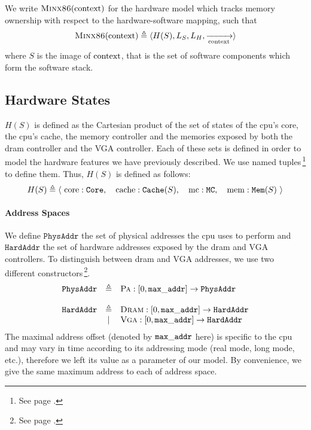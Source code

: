 \begin{definition}
  \label{def:speccert2:minx86}
  We write $\textsc{Minx86}(\mathrm{context})$ for the hardware model which
  tracks memory ownership with respect to the  hardware-software
  mapping, such that
%
  \[
    \textsc{Minx86}(\mathrm{context}) \triangleq \langle H(S), L_S, L_H,
    \xrightarrow[\mathrm{context}]{} \rangle
  \]
  where $S$ is the image of $\mathrm{context}$, that is the set of software
  components which form the software stack.
\end{definition}

\subsection{Hardware States}

$H(S)$ is defined as the Cartesian product of the set of states of the
\ac{cpu}'s core, the \ac{cpu}'s cache, the memory controller and the memories
exposed by both the \ac{dram} controller and the VGA controller.
%
Each of these sets is defined in order to model the hardware features we have
previously described.
%
We use named tuples\,\footnote{See page \pageref{frontmatter:notations}.} to
define them.
%
Thus, $H(S)$ is defined as follows:
%
\[
  H(S) \triangleq \left<\ \mathrm{core}: \texttt{Core},\quad\mathrm{cache}:
  \texttt{Cache}(S),\quad\mathrm{mc}: \texttt{MC},\quad\mathrm{mem}: \texttt{Mem}(S)
  \ \right>
\]

\paragraph{Address Spaces}
%
We define $\texttt{PhysAddr}$ the set of physical addresses the \ac{cpu} uses to
perform \IO and $\texttt{HardAddr}$ the set of hardware addresses exposed by the
\ac{dram} and VGA controllers.
%
To distinguish between \ac{dram} and VGA addresses, we use two different
constructors\,\footnote{See page \pageref{frontmatter:notations}.}.
%
\[
  \begin{array}{rcl}
    \texttt{PhysAddr}
    & \triangleq
    & \textsc{Pa} : [0, \val{max\_addr}] \rightarrow
      \texttt{PhysAddr} \\
    & %
    & \\ %
    \texttt{HardAddr}
    & \triangleq
    & \textsc{Dram} : [0, \val{max\_addr}] \rightarrow
      \texttt{HardAddr} \\
    & |
    & \textsc{Vga} : [0, \val{max\_addr}] \rightarrow
      \texttt{HardAddr}
  \end{array}
\]
%
The maximal address offset (denoted by $\mathtt{max\_addr}$ here) is specific to
the \ac{cpu} and may vary in time according to its addressing mode (real mode,
long mode, etc.), therefore we left its value as a parameter of our model.
%
By convenience, we give the same maximum address to each of address space.

